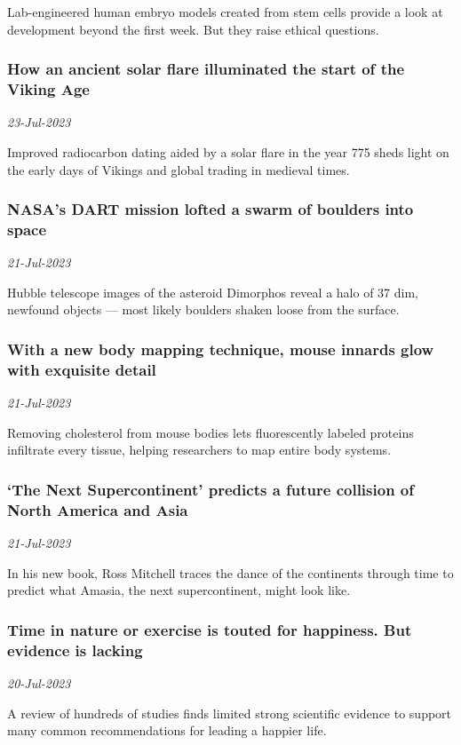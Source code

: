 Lab-engineered human embryo models created from stem cells provide a look at development beyond the first week. But they raise ethical questions.
\subsubsection{How an ancient solar flare illuminated the start of the Viking Age \href{https://www.sciencenews.org/article/viking-age-ancient-solar-flare-trade-archaeology}{}}
\textit{23-Jul-2023}

Improved radiocarbon dating aided by a solar flare in the year 775 sheds light on the early days of Vikings and global trading in medieval times.
\subsubsection{NASA’s DART mission lofted a swarm of boulders into space \href{https://www.sciencenews.org/article/nasa-dart-mission-boulder-asteroid-space}{}}
\textit{21-Jul-2023}

Hubble telescope images of the asteroid Dimorphos reveal a halo of 37 dim, newfound objects — most likely boulders shaken loose from the surface.
\subsubsection{With a new body mapping technique, mouse innards glow with exquisite detail \href{https://www.sciencenews.org/article/new-body-mapping-technique-mouse-organ}{}}
\textit{21-Jul-2023}

Removing cholesterol from mouse bodies lets fluorescently labeled proteins infiltrate every tissue, helping researchers to map entire body systems.
\subsubsection{‘The Next Supercontinent’ predicts a future collision of North America and Asia \href{https://www.sciencenews.org/article/next-supercontinent-book-north-america-asia-collision}{}}
\textit{21-Jul-2023}

In his new book, Ross Mitchell traces the dance of the continents through time to predict what Amasia, the next supercontinent, might look like.
\subsubsection{Time in nature or exercise is touted for happiness. But evidence is lacking \href{https://www.sciencenews.org/article/nature-exercise-happiness-psychology}{}}
\textit{20-Jul-2023}

A review of hundreds of studies finds limited strong scientific evidence to support many common recommendations for leading a happier life.
